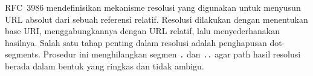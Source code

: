 RFC~3986 mendefinisikan mekanisme resolusi yang digunakan untuk menyusun URL absolut dari sebuah referensi relatif. Resolusi dilakukan dengan menentukan base URI, menggabungkannya dengan URL relatif, lalu menyederhanakan hasilnya. Salah satu tahap penting dalam resolusi adalah penghapusan dot-segments. Prosedur ini menghilangkan segmen \texttt{.} dan \texttt{..} agar path hasil resolusi berada dalam bentuk yang ringkas dan tidak ambigu.
